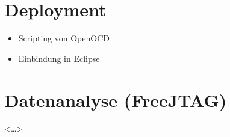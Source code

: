 \section{Deployment}
\begin{itemize}
  \item Scripting von OpenOCD
  \item Einbindung in Eclipse
\end{itemize}
\section{Datenanalyse (FreeJTAG)}
<\ldots>